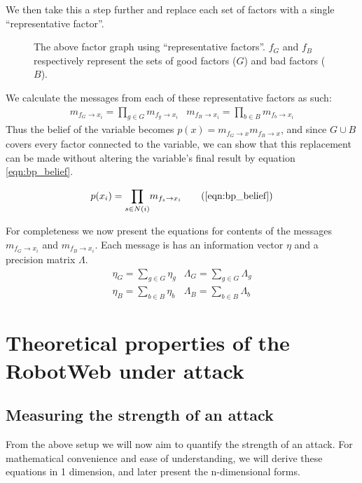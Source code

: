 We then take this a step further and replace each set of factors with a single ``representative factor''.
\begin{figure}[!ht]
	\centering
	

	\caption[Representative factor graph around a single variable]{The above factor graph using ``representative factors''. $f_G$ and $f_B$ respectively represent the sets of good factors ($G$) and bad factors ($B$).}
\end{figure}

We calculate the messages from each of these representative factors as such:
\begin{eqnarray}
	m_{f_G \rightarrow x_i} = \underset{g \in G}{\prod} m_{f_g \rightarrow x_i}&
	m_{f_B \rightarrow x_i} = \underset{b \in B}{\prod} m_{f_b \rightarrow x_i}
\end{eqnarray}
Thus the belief of the variable becomes $p(x) = m_{f_G \rightarrow x} m_{f_B \rightarrow x}$, and since $G \cup B$ covers every factor connected to the variable, we can show that this replacement can be made without altering the variable's final result by equation \ref{eqn:bp_belief}.

\begin{equation}
	p(x_i) = \underset{s \in N(i)}{\prod} m_{f_s \rightarrow x_i}
	\tag{\ref{eqn:bp_belief}}
\end{equation}

For completeness we now present the equations for contents of the messages $m_{f_G \rightarrow x_i}$ and $m_{f_B \rightarrow x_i}$. 
Each message is has an information vector $\eta$ and a precision matrix $\Lambda$.
\begin{eqnarray}
	\eta_G = \underset{g \in G}{\sum} \eta_g&
	\Lambda_G = \underset{g \in G}{\sum} \Lambda_g \label{eqn:good_pull}\\
	\eta_B = \underset{b \in B}{\sum} \eta_b&
	\Lambda_B = \underset{b \in B}{\sum} \Lambda_b \label{eqn:bad_pull}
\end{eqnarray}

\section{Theoretical properties of the RobotWeb under attack}
\subsection{Measuring the strength of an attack}
From the above setup we will now aim to quantify the strength of an attack. For mathematical convenience and ease of understanding, we will derive these equations in 1 dimension, and later present the n-dimensional forms.

